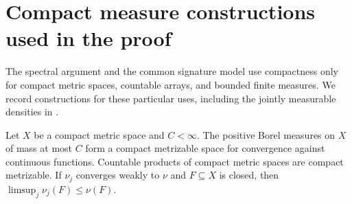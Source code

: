 \section{Compact measure constructions used in the proof}
\label{sec:measure-constructions}

The spectral argument and the common signature model use compactness
only for compact metric spaces, countable arrays, and bounded finite
measures. We record constructions for these particular uses, including
the jointly measurable densities in .

\begin{lemma}
\label{lem:compact-measures}
Let $X$ be a compact metric space and $C<\infty$.
The positive Borel measures on $X$ of mass at most $C$ form a compact
metrizable space for convergence against continuous functions.
Countable products of compact metric spaces are compact metrizable.
If $\nu_j$ converges weakly to $\nu$ and $F\subseteq X$ is closed,
then $\limsup_j\nu_j(F)\le\nu(F)$.
\end{lemma}
